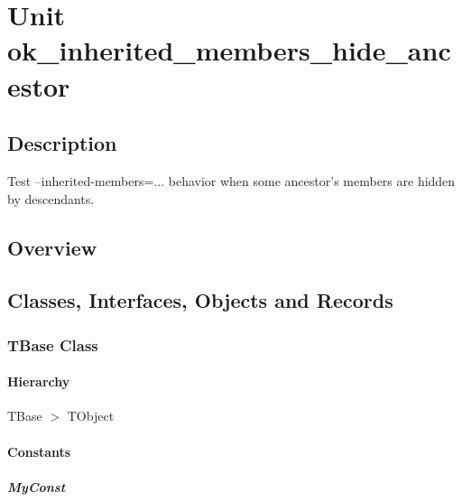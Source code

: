 \documentclass{report}
\begin{document}
\newlength{\tmplength}
\chapter{Unit ok{\_}inherited{\_}members{\_}hide{\_}ancestor}
\section{Description}
Test --inherited{-}members=... behavior when some ancestor's members are hidden by descendants.
\section{Overview}
\begin{description}
\item[\texttt{\begin{ttfamily}TBase\end{ttfamily} Class}]
\item[\texttt{\begin{ttfamily}TDerived\end{ttfamily} Class}]
\item[\texttt{\begin{ttfamily}TNewDerived\end{ttfamily} Class}]
\end{description}
\section{Classes, Interfaces, Objects and Records}
\subsection*{TBase Class}
\subsubsection*{\large{\textbf{Hierarchy}}\normalsize\hspace{1ex}\hfill}
TBase {$>$} TObject
\subsubsection*{\large{\textbf{Constants}}\normalsize\hspace{1ex}\hfill}
\paragraph*{MyConst}\hspace*{\fill}
\end{document}
